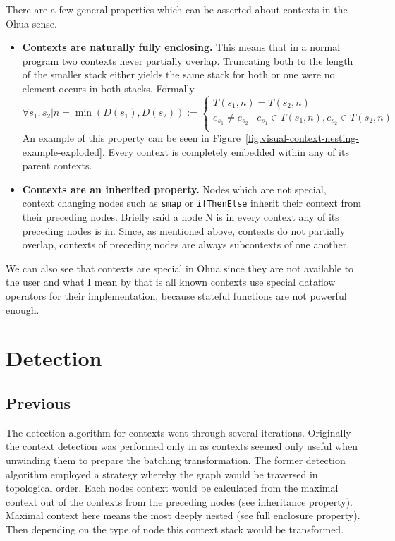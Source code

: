 There are a few general properties which can be asserted about contexts in the Ohua sense.

\begin{itemize}
  \item \textbf{Contexts are naturally fully enclosing.}
        This means that in a normal program two contexts never partially overlap.
        Truncating both to the length of the smaller stack either yields the same stack for both or one were no element occurs in both stacks.
        Formally
        \[
        \forall s_1, s_2 | n = \min(D(s_1), D(s_2)) :=
          \begin{cases}
            T(s_1, n) = T(s_2, n) \\
            e_{s_1} \neq e_{s_2} \mid e_{s_1} \in T(s_1, n), e_{s_2} \in T(s_2, n) \\
          \end{cases}
        \]
        An example of this property can be seen in Figure~\ref{fig:visual-context-nesting-example-exploded}.
        Every context is completely embedded within any of its parent contexts.

  \item \textbf{Contexts are an inherited property.}
        Nodes which are not special, context changing nodes such as \texttt{smap} or \texttt{ifThenElse} inherit their context from their preceding nodes.
        Briefly said a node N is in every context any of its preceding nodes is in.
        Since, as mentioned above, contexts do not partially overlap, contexts of preceding nodes are always subcontexts of one another.
\end{itemize}

We can also see that contexts are special in Ohua since they are not available to the user and what I mean by that is all known contexts use special dataflow operators for their implementation, because stateful functions are not powerful enough.

\section{Detection}

\subsection{Previous}

The detection algorithm for contexts went through several iterations.
Originally the context detection was performed only in \yauhau{} as contexts seemed only useful when unwinding them to prepare the batching transformation.
The former detection algorithm employed a strategy whereby the graph would be traversed in topological order.
Each nodes context would be calculated from the maximal context out of the contexts from the preceding nodes (see inheritance property).
Maximal context here means the most deeply nested (see full enclosure property).
Then depending on the type of node this context stack would be transformed.

